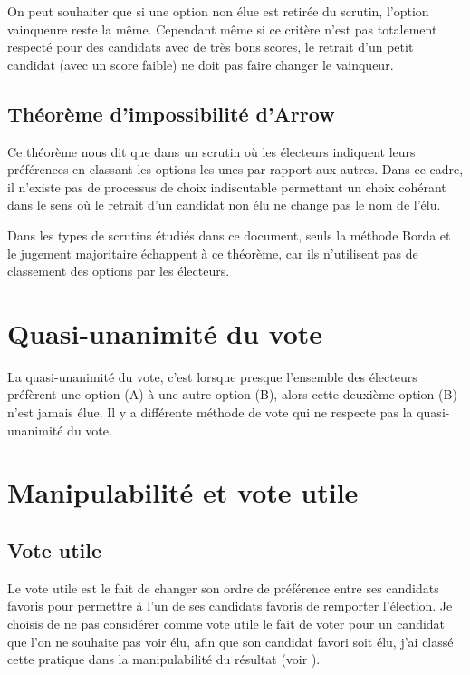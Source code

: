 \documentclass[../report]{subfiles}
\begin{document}
  On peut souhaiter que si une option non élue est retirée du scrutin, l'option vainqueure reste
  la même.
  Cependant même si ce critère n'est pas totalement respecté pour des candidats avec de très bons 
  scores, le retrait d'un petit candidat (avec un score faible) ne doit pas faire changer 
  le vainqueur.

  \subsection{Théorème d'impossibilité d'Arrow}

  Ce théorème nous dit que dans un scrutin où les électeurs indiquent leurs préférences en classant les
  options les unes par rapport aux autres.
  Dans ce cadre, il n'existe pas de processus de choix indiscutable permettant un choix 
  cohérant dans le sens où le retrait d'un candidat non élu ne change pas le nom de l'élu.

  Dans les types de scrutins étudiés dans ce document, seuls la méthode Borda et le 
  jugement majoritaire échappent à ce théorème, car ils n'utilisent pas de classement des 
  options par les électeurs.

  \section{Quasi-unanimité du vote}

  La quasi-unanimité du vote, c'est lorsque presque l'ensemble des électeurs préfèrent 
  une option (A) à une autre option (B), alors cette deuxième option (B) n'est jamais élue.
  Il y a différente méthode de vote qui ne respecte pas la quasi-unanimité du vote.


  \section{Manipulabilité et vote utile}

  \subsection{Vote utile}%
  \label{diff:comp:util:util}

  Le vote utile est le fait de changer son ordre de préférence entre ses candidats favoris pour
  permettre à l'un de ses candidats favoris de remporter l'élection. 
  Je choisis de ne pas considérer comme vote utile le fait de voter pour un candidat que l'on ne
  souhaite pas voir élu, afin que son candidat favori soit élu, j'ai classé cette pratique 
  dans la manipulabilité du résultat (voir ).
\end{document}
